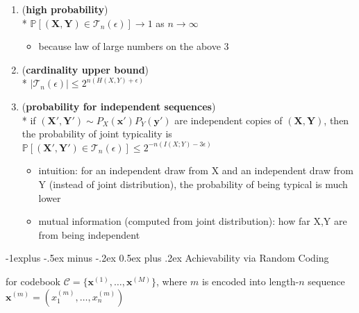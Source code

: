 \documentclass[10pt, landscape]{article}
\makeatletter
\renewcommand{\subsection}{\@startsection{subsection}{2}{0mm}%
  {-1explus -.5ex minus -.2ex}%
  {0.5ex plus .2ex}%
{\normalfont\normalsize\bfseries}}
\makeatother
\begin{document}
\begin{multicols*}{4}
\begin{enumerate}
    \item (\textbf{high probability}) \\*
      $\mathbb{P}[(\mathbf{X}, \mathbf{Y}) \in \mathcal{T}_n(\epsilon)] \to 1$ as $n \to \infty$
      \begin{itemize}
        \item because law of large numbers on the above 3 
      \end{itemize}
    \item (\textbf{cardinality upper bound}) \\*
      \( {\displaystyle{ \vert \mathcal{T}_n(\epsilon) \vert \leq 2^{n(H(X,Y)+\epsilon)} }} \) 
    \item (\textbf{probability for independent sequences}) \\*
      if $(\mathbf{X}', \mathbf{Y}') \sim P_X(\mathbf{x}')P_Y(\mathbf{y}')$ are independent copies of  $(\mathbf{X}, \mathbf{Y})$, then the probability of joint typicality is 
      $\mathbb{P}[(\mathbf{X}', \mathbf{Y}') \in \mathcal{T}_n(\epsilon)] \leq 2^{-n(I(X;Y)-3\epsilon)}$
      \begin{itemize}
        \item intuition: for an independent draw from X and an independent draw from Y (instead of joint distribution), the probability of being typical is much lower
        \item mutual information (computed from joint distribution): how far X,Y are from being independent
      \end{itemize}
  \end{enumerate}

  \subsection{Achievability via Random Coding}

  for codebook $\mathcal{C} = \{ \mathbf{x}^{(1)}, \dots, \mathbf{x}^{(M)} \}$, where $m$ is encoded into length-$n$ sequence $\mathbf{x}^{(m)} = ( x_1^{(m)}, \dots, x_n^{(m)} )$


\end{multicols*}
\end{document}
